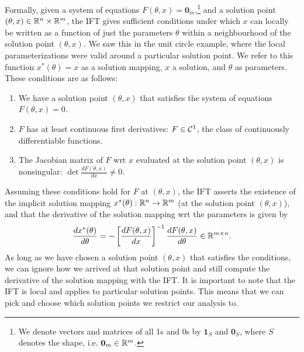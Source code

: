 \documentclass[11pt]{article}
\begin{document}
Formally, given a system of equations $F(\theta, x) = \mathbf{0}_m$,\footnote{
We denote vectors and matrices of all 1s and 0s by $\mathbf{1}_S$
and $\mathbf{0}_S$, where $S$ denotes the shape, i.e. $\mathbf{0}_m\in\mathbb{R}^m$.
}
and a solution point $(\theta,x) \in \mathbb{R}^n\times\mathbb{R}^m$,
the IFT gives sufficient conditions under which $x$ can locally be written as a function
of just the parameters $\theta$ within a neighbourhood of the solution point $(\theta,x)$.
We saw this in the unit circle example, where the local parameterizations were
valid around a particular solution point.
We refer to this function $x^*(\theta) = x$ as a solution mapping,
$x$ a solution, and $\theta$ as parameters.
These conditions are as follows:
\begin{enumerate}
\item We have a solution point $(\theta, x)$ that satisfies the system of equations
    $F(\theta, x) = 0$.
\item $F$ has at least continuous first derivatives: $F \in \mathcal{C}^1$,
    the class of continuously differentiable functions.
\item The Jacobian matrix
    of $F$ wrt $x$ evaluated at the solution point $(\theta,x)$ is nonsingular:
    $\det \frac{d F(\theta,x)}{d x} \neq 0$.
\end{enumerate}
Assuming these conditions hold for $F$ at $(\theta,x)$, the IFT
asserts the existence of the implicit solution mapping $x^*(\theta):\mathbb{R}^n\to\mathbb{R}^m$
(at the solution point $(\theta,x)$),
and that the derivative of the solution mapping wrt the parameters is given by
\begin{equation}
    \label{eqn:iftderiv}
    \frac{d x^*(\theta)}{d\theta} = -\left[\frac{dF(\theta,x)}{dx}\right]^{-1}
    \frac{d F(\theta,x)}{d\theta} \in \mathbb{R}^{m\times n}.
\end{equation}
As long as we have chosen a solution point $(\theta,x)$ that satisfies the conditions,
we can ignore how we arrived at that solution point and still compute the derivative
of the solution mapping with the IFT.
It is important to note that the IFT is local and applies to particular solution points.
This means that we can pick and choose which solution points we restrict our analysis to.
\end{document}
